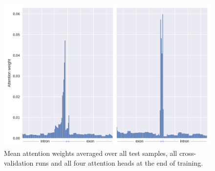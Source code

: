 \begin{figure}[h]
	\centering\includegraphics[width=1\textwidth]{../visualizations/ch5-results/mean_attention_barchart_not_zoomed.png}
	\caption{Mean attention weights averaged over all test samples, all cross-validation runs and all four attention heads at the end of training. }
	\label{app:mean_attn}
\end{figure}
 

